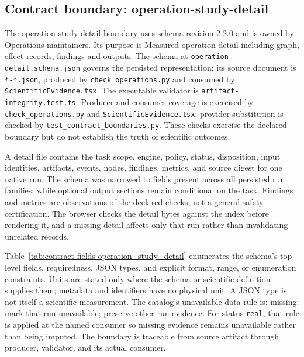 \subsection{Contract boundary: operation-study-detail}\label{sec:contract-operation_study_detail}
The operation-study-detail boundary uses schema revision 2.2.0 and is owned by Operations maintainers. Its purpose is Measured operation detail including graph, effect records, findings and outputs. The schema at \texttt{operation-detail.schema.json} governs the persisted representation; its source document is \texttt{*-*.json}, produced by \texttt{check\_\allowbreak{}operations.py} and consumed by \texttt{Scientific\allowbreak{}Evidence.tsx}. The executable validator is \texttt{artifact-integrity.test.ts}. Producer and consumer coverage is exercised by \texttt{check\_\allowbreak{}operations.py} and \texttt{Scientific\allowbreak{}Evidence.tsx}; provider substitution is checked by \texttt{test\_\allowbreak{}contract\_\allowbreak{}boundaries.py}. These checks exercise the declared boundary but do not establish the truth of scientific outcomes.

A detail file contains the task scope, engine, policy, status, disposition, input identities, artifacts, events, nodes, findings, metrics, and source digest for one native run. The schema was narrowed to fields present across all persisted run families, while optional output sections remain conditional on the task. Findings and metrics are observations of the declared checks, not a general safety certification. The browser checks the detail bytes against the index before rendering it, and a missing detail affects only that run rather than invalidating unrelated records.

Table~\ref{tab:contract-fields-operation_study_detail} enumerates the schema's top-level fields, requiredness, JSON types, and explicit format, range, or enumeration constraints. Units are stated only where the schema or scientific definition supplies them; metadata and identifiers have no physical unit. A JSON type is not itself a scientific measurement. The catalog's unavailable-data rule is: missing: mark that run unavailable; preserve other run evidence. For status \texttt{real}, that rule is applied at the named consumer so missing evidence remains unavailable rather than being imputed. The boundary is traceable from source artifact through producer, validator, and its actual consumer.

